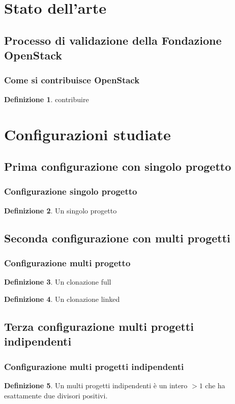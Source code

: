 \documentclass{beamer}
\theoremstyle{definition}
\newtheorem{definizione}{Definizione}
\theoremstyle{plain}
\begin{document}
\section{Stato dell'arte}
\subsection{Processo di validazione della Fondazione OpenStack}
\begin{frame}
\frametitle{Come si contribuisce OpenStack}
\begin{definizione}
 \alert{contribuire} 
\end{definizione}
\end{frame}

\section{Configurazioni studiate}
\subsection{Prima configurazione con singolo progetto}
\begin{frame}
\frametitle{Configurazione singolo progetto}
\begin{definizione}
Un \alert{singolo progetto}
\end{definizione}
\end{frame}

\subsection{Seconda configurazione con multi progetti}
\begin{frame}
\frametitle{Configurazione multi progetto}
\begin{definizione}
Un \alert{clonazione full} 
\end{definizione}
\begin{definizione}
Un \alert{clonazione linked} 
\end{definizione}
\end{frame}

\subsection{Terza configurazione multi progetti indipendenti}
\begin{frame}
\frametitle{Configurazione multi progetti indipendenti}
\begin{definizione}
Un \alert{multi progetti indipendenti} è un intero $>1$ che ha esattamente
due divisori positivi.
\end{definizione}
\end{frame}
\end{document}
